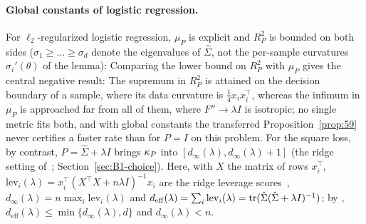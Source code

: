 \paragraph{Global constants of logistic regression.}
For $\ell_2$-regularized logistic regression, $\mu_P$ is explicit and $R_P^2$ is bounded on both sides
($\sigma_1\ge\dots\ge\sigma_d$ denote the eigenvalues of $\hat\Sigma$, not the per-sample curvatures
$\sigma_i'(\theta)$ of the lemma):
Comparing the lower bound on $R_P^2$ with $\mu_P$ gives the central negative result:
The supremum in $R_P^2$ is attained on the decision boundary of a sample, where its data curvature is
$\frac14x_ix_i^\top$, whereas the infimum in $\mu_P$ is approached far from all of them, where $F''\to\lambda I$ is
isotropic; no single metric fits both, and with global constants the transferred Proposition~\ref{prop:59} never
certifies a faster rate than for $P=I$ on this problem. For the square loss, by contrast, $P=\hat\Sigma+\lambda I$ brings
$\kappa_P$ into $[d_\infty(\lambda),d_\infty(\lambda)+1]$ (the ridge setting of~\cite{gonen2016solving};
Section~\ref{sec:B1-choice}). Here, with $X$ the matrix of rows $x_i^\top$,
$\mathrm{lev}_i(\lambda)=x_i^\top(X^\top X+n\lambda I)^{-1}x_i$ are the ridge leverage
scores~\cite{elalaoui2015fast,bach2013sharp}, $d_\infty(\lambda)=n\max_i\mathrm{lev}_i(\lambda)$ and
$d_{\mathrm{eff}}(\lambda)=\sum_i\mathrm{lev}_i(\lambda)=\operatorname{tr}(\hat\Sigma(\hat\Sigma+\lambda I)^{-1})$; by
, $d_{\mathrm{eff}}(\lambda)\le\min\{d_\infty(\lambda),d\}$ and $d_\infty(\lambda)<n$.

